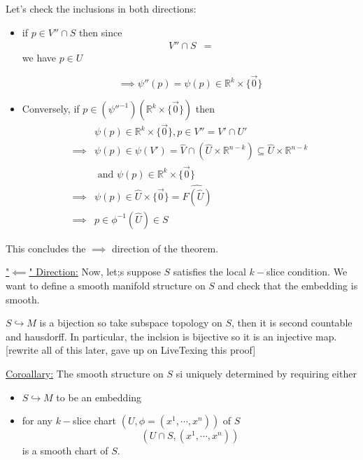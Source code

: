 \documentclass{article}
\newcommand{\R}{\mathbb{R}}
\begin{document}
Let's check the inclusions in both directions:
\begin{itemize}
  \item if $p \in V'' \cap S$ then since 
  \begin{align*}
    V'' \cap S &= 
  \end{align*}
  we have $p \in U$

  \[ \implies \psi''(p) = \psi(p) \in \R^k \times \{ \vec{0}\} \]

  \vskip 0.5cm
  \item Conversely, if $p \in (\psi''^{-1})(\R^k \times \{\vec{0}\})$ then
  \begin{align*}
    &\psi(p) \in \R^k \times \{\vec{0}\},  p \in V'' = V' \cap U' \\
    \implies &\psi(p) \in \psi(V') = \hat{V} \cap \left( \hat{U} \times \R^{n-k} \right) \subseteq \hat{U} \times \R^{n-k} \\
    & \text{ and } \psi(p) \in \R^k \times \{\vec{0}\} \\
    \implies &\psi(p) \in \hat{U} \times \{\vec{0}\} = \hat{F\left( \hat{U} \right)} \\
    \implies & p \in \phi^{-1}(\hat{U}) \in S
  \end{align*} 
\end{itemize}
This concludes the $\implies$ direction of the theorem.

\vskip 0.5cm
\underline{"$\impliedby$" Direction:} Now, let;s suppose $S$ satisfies the local $k-$slice condition. We want to define a smooth manifold structure on $S$ and check that the embedding is smooth. 

\vskip 0.5cm

$S \hookrightarrow M$ is a bijection so take subspace topology on $S$, then it is second countable and hausdorff. In particular, the inclsion is bijective so it is an injective map. [rewrite all of this later, gave up on LiveTexing this proof]


\vskip 1cm
\begin{dottedbox}
  \underline{Coroallary:} The smooth structure on $S$ si uniquely determined by requiring either
  \begin{itemize}
    \item $S \hookrightarrow M$ to be an embedding
    \item for any $k-$slice chart $(U, \phi = (x^1, \cdots, x^n))$ of $S$
    \[ \left( U \cap S, (x^1, \cdots, x^n)\right) \]
    is a smooth chart of $S$.  
  \end{itemize}
\end{dottedbox}
\end{document}

